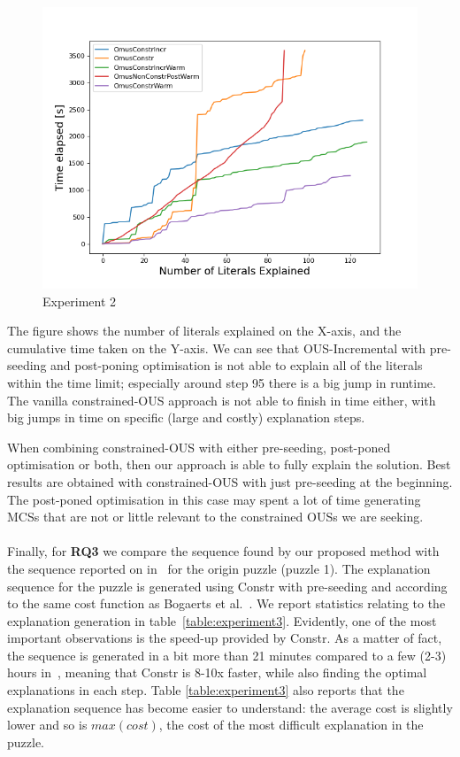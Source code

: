 \begin{figure}[t]
    \centering
    \includegraphics[width=\columnwidth]{figures/omusConstrCumulative.png}
    \caption{Experiment 2}
    \label{fig:exp2}
\end{figure}

The figure shows the number of literals explained on the X-axis, and the cumulative time taken on the Y-axis. 
We can see that OUS-Incremental with pre-seeding and post-poning optimisation is not able to explain all of the literals within the time limit; especially around step 95 there is a big jump in runtime. The vanilla constrained-OUS approach is not able to finish in time either, with big jumps in time on specific (large and costly) explanation steps.

When combining constrained-OUS with either pre-seeding, post-poned optimisation or both, then our approach is able to fully explain the solution. Best results are obtained with constrained-OUS with just pre-seeding at the beginning. The post-poned optimisation in this case may spent a lot of time generating MCSs that are not or little relevant to the constrained OUSs we are seeking.

\paragraph{}
Finally, for \textbf{RQ3} we compare the sequence found by our proposed method with the sequence reported on in~\cite{ecai/BogaertsGCG20} for the origin puzzle (puzzle 1). 
The explanation sequence for the puzzle is generated using \omus Constr with pre-seeding and according to the same cost function as Bogaerts et al.~\cite{ecai/BogaertsGCG20}. We report statistics relating to the explanation generation in table~\ref{table:experiment3}.
Evidently, one of the most important observations is the speed-up provided by \omus Constr. 
As a matter of fact, the sequence is generated in a bit more than 21 minutes compared to a few (2-3) hours in~\cite{ecai/BogaertsGCG20}, meaning that \omus Constr is 8-10x faster, while also finding the optimal explanations in each step.
Table \ref{table:experiment3} also reports that the explanation sequence has become easier to understand: the average cost is slightly lower and so is $max(cost)$, the cost of the most difficult explanation in the puzzle. 



